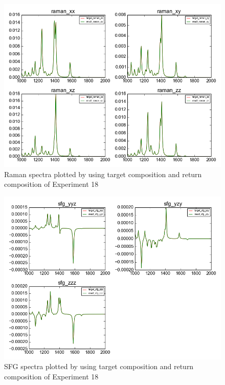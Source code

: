 \begin{figure}[!ht] \label{fig:4.6}
\centering
\includegraphics[scale=0.5]{Figures/chapter4_result_target_plotting_500datapoint_raman.png}
\caption{Raman spectra plotted by using target composition and return composition of Experiment 18} 
\end{figure}

\begin{figure}[!ht] \label{fig:4.7}
\centering
\includegraphics[scale=0.5]{Figures/chapter4_result_target_plotting_500datapoint_sfg.png}
\caption{SFG spectra plotted by using target composition and return composition of Experiment 18} 
\end{figure} 


